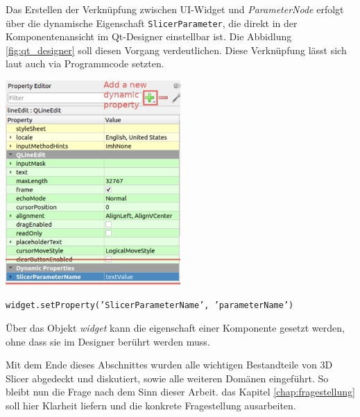 \begin{minipage}{0.35\textwidth}
	Das Erstellen der Verknüpfung zwischen UI-Widget und \textit{ParameterNode}
	erfolgt über die dynamische Eigenschaft \texttt{SlicerParameter}, die direkt
	in der Komponentenansicht im Qt-Designer einstellbar ist. Die Abbidlung \ref{fig:qt_designer}
	soll diesen Vorgang verdeutlichen. Diese Verknüpfung lässt sich laut \citet{slicer2024}
	auch via Programmcode setzten.
\end{minipage}
\hfill
\begin{minipage}{0.55\textwidth}
	\centering
	\includegraphics[width=0.5\textwidth]{img/qt_designer.jpg}
	\label{fig:qt_designer}
\end{minipage}

\texttt{widget.setProperty('SlicerParameterName', 'parameterName')}

Über das Objekt \textit{widget} kann die eigenschaft einer Komponente gesetzt werden,
ohne dass sie im Designer berührt werden muss.

Mit dem Ende dieses Abschnittes wurden alle wichtigen Bestandteile von 3D Slicer
abgedeckt und diskutiert, sowie alle weiteren Domänen eingeführt. So bleibt nun
die Frage nach dem Sinn dieser Arbeit. das Kapitel \ref{chap:fragestellung} soll
hier Klarheit liefern und die konkrete Fragestellung ausarbeiten.
